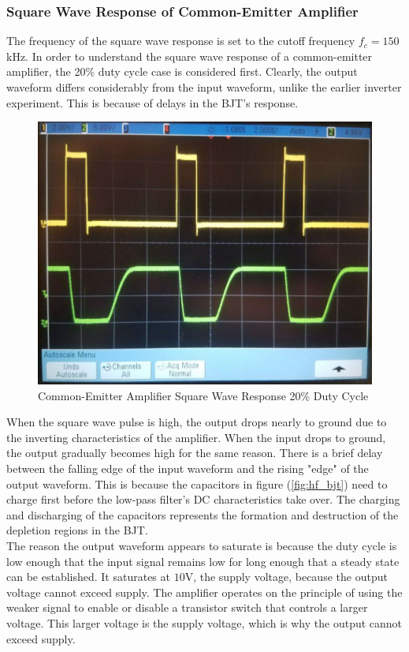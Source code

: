 \subsubsection{Square Wave Response of Common-Emitter Amplifier}
The frequency of the square wave response is set to the cutoff frequency $f_c = 150$\si{\kilo\hertz}. In order to understand the square wave response of a common-emitter amplifier, the 20\% duty cycle case is considered first. Clearly, the output waveform differs considerably from the input waveform, unlike the earlier inverter experiment. This is because of delays in the BJT's response.
\FloatBarrier
\begin{figure}[h!]
	\centering
	\includegraphics[scale=0.25]{./images/amplifier_20_duty_cycle.jpeg}
	\caption{Common-Emitter Amplifier Square Wave Response 20\% Duty Cycle}
	\label{fig:twenty_perc_duty_cycle}
\end{figure}
\FloatBarrier
When the square wave pulse is high, the output drops nearly to ground due to the inverting characteristics of the amplifier. When the input drops to ground, the output gradually becomes high for the same reason. There is a brief delay between the falling edge of the input waveform and the rising "edge" of the output waveform. This is because the capacitors in figure (\ref{fig:hf_bjt}) need to charge first before the low-pass filter's DC characteristics take over. The charging and discharging of the capacitors represents the formation and destruction of the depletion regions in the BJT. \\
The reason the output waveform appears to saturate is because the duty cycle is low enough that the input signal remains low for long enough that a steady state can be established. It saturates at $10$\si{\volt}, the supply voltage, because the output voltage cannot exceed supply. The amplifier operates on the principle of using the weaker signal to enable or disable a transistor switch that controls a larger voltage. This larger voltage is the supply voltage, which is why the output cannot exceed supply. \\
